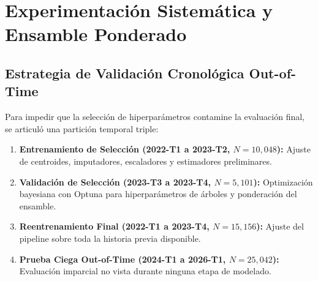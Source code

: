 \documentclass[11pt,a4paper]{article}
\begin{document}
\section{Experimentación Sistemática y Ensamble Ponderado}

\subsection{Estrategia de Validación Cronológica Out-of-Time}
Para impedir que la selección de hiperparámetros contamine la evaluación final, se articuló una partición temporal triple:
\begin{enumerate}
    \item \textbf{Entrenamiento de Selección (2022-T1 a 2023-T2, $N=10,048$):} Ajuste de centroides, imputadores, escaladores y estimadores preliminares.
    \item \textbf{Validación de Selección (2023-T3 a 2023-T4, $N=5,101$):} Optimización bayesiana con Optuna para hiperparámetros de árboles y ponderación del ensamble.
    \item \textbf{Reentrenamiento Final (2022-T1 a 2023-T4, $N=15,156$):} Ajuste del pipeline sobre toda la historia previa disponible.
    \item \textbf{Prueba Ciega Out-of-Time (2024-T1 a 2026-T1, $N=25,042$):} Evaluación imparcial no vista durante ninguna etapa de modelado.
\end{enumerate}
\end{document}
